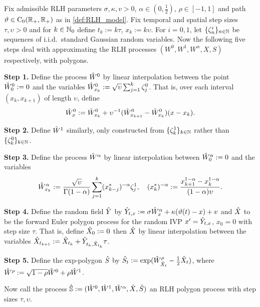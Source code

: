 \begin{definition}\label{def:rlh_polygon}
    Fix admissible RLH parameters $\sigma, \kappa,v>0$, $\alpha\in(0,\frac12)$, $\rho\in[-1,1]$ and path $\vartheta\in\mathrm{C}_0(\mathbb{R}_+,\mathbb{R}_+)$ as in \autoref{def:RLH_model}. Fix temporal and spatial step sizes $\tau,\upsilon>0$ and for $k\in\mathbb{N}_0$ define $t_k:=k\tau$, $x_k:=k\upsilon$. For $i=0,1$, let $\{\zeta^i_n\}_{n\in\mathbb{N}}$ be sequences of i.i.d.~standard Gaussian random variables. Now the following five steps deal with approximating the RLH processes $(W^0,W^1,W^\alpha,X,S)$ respectively, with polygons.

    \textbf{Step 1.} Define the process ${\hat{W}}^0$ by linear interpolation between the point ${\hat{W}}^0_0:=0$ and the variables ${\hat{W}}^0_{x_k}:=\sqrt{\upsilon}\sum_{j=1}^k\zeta^0_j$. That is, over each interval $(x_k,x_{k+1})$ of length $\upsilon$, define
    \begin{equation}
        {\hat{W}}^0_{x} := {\hat{W}}^0_{x_k} + \upsilon^{-1}({\hat{W}}^0_{x_{k+1}} - {\hat{W}}^0_{x_k})(x - x_k).
    \end{equation}

    \textbf{Step 2.} Define ${\hat{W}}^1$ similarly, only constructed from $\{\zeta^1_k\}_{k\in\mathbb{N}}$ rather than $\{\zeta^0_k\}_{k\in\mathbb{N}}$.

    \textbf{Step 3.} Define the process ${\hat{W}}^\alpha$ by linear interpolation between ${\hat{W}}^\alpha_0:=0$ and the variables
    \begin{equation}\label{eq:RL_polygon}
        {\hat{W}}^\alpha_{x_k} := \frac{\sqrt{\upsilon}}{\Gamma(1-\alpha)}\sum_{j=1}^k(x^*_{k-j})^{-\alpha}\zeta^1_j,\quad (x^*_k)^{-\alpha} := \frac{x_{k+1}^{1-\alpha} - x_k^{1-\alpha}}{(1-\alpha)\upsilon}.
    \end{equation}

    \textbf{Step 4.} Define the random field ${\hat{Y}}$ by ${\hat{Y}}_{t,x}:=\sigma {\hat{W}}^\alpha_x + \kappa(\vartheta(t) - x)+v$ and ${\hat{X}}$ to be the forward Euler polygon process for the random IVP $x'={\hat{Y}}_{t,x}$, $x_0=0$ with step size $\tau$. That is, define ${\hat{X}}_0:=0$ then ${\hat{X}}$ by linear interpolation between the variables ${\hat{X}}_{t_{k+1}}:= {\hat{X}}_{t_k} + {\hat{Y}}_{t_k,{\hat{X}}_{t_k}}\tau$.

    \textbf{Step 5.} Define the exp-polygon ${\hat{S}}$ by ${\hat{S}}_t:=\exp({\hat{W}}^\rho_{{\hat{X}}_t} - \frac12{\hat{X}}_t)$, where ${\hat{W}}^\rho:=\sqrt{1-\rho}{\hat{W}}^0 + \rho{\hat{W}}^1$.
\end{definition}

Now call the process $\hat{\mathbb{S}}:=({\hat{W}}^0,{\hat{W}}^1,{\hat{W}}^\alpha,{\hat{X}},{\hat{S}})$ an RLH polygon process with step sizes $\tau,\upsilon$.


